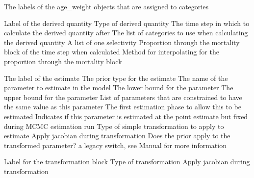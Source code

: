  {The labels of the age\_weight objects that are assigned to categories}
\par\par
{} {Label of the derived quantity}
 {Type of derived quantity}
 {The time step in which to calculate the derived quantity after}
 {The list of categories to use when calculating the derived quantity}
 {A list of one selectivity}
 {Proportion through the mortality block of the time step when calculated}
 {Method for interpolating for the proportion through the mortality block}
 {}
\par\textbf{}\par
\par\textbf{}\par
{}\par\par
{} {The label of the estimate}
 {The prior type for the estimate}
 {The name of the parameter to estimate in the model}
 {The lower bound for the parameter}
 {The upper bound for the parameter}
 {List of parameters that are constrained to have the same value as this parameter}
 {The first estimation phase to allow this to be estimated}
 {Indicates if this parameter is estimated at the point estimate but fixed during MCMC estimation run}
 {Type of simple transformation to apply to estimate}
 {Apply jacobian during transformation}
 {Does the prior apply to the transformed parameter? a legacy switch, see Manual for more information}
\par\par
{} {Label for the transformation block}
 {Type of transformation}
 {Apply jacobian during transformation}
\par\par
